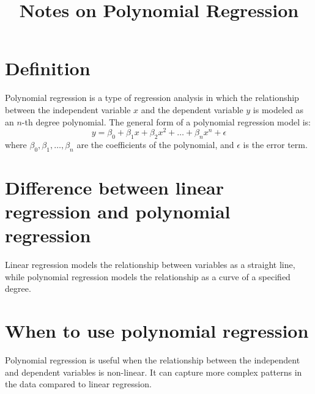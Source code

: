 \documentclass[conference]{IEEEtran}
\title{Notes on Polynomial Regression}
\author{
\IEEEauthorblockN{Luis Mendez}
}
\begin{document}
\maketitle

\section*{Definition}
Polynomial regression is a type of regression analysis in which the relationship between the independent variable \( x \) and the dependent variable \( y \) is modeled as an \( n \)-th degree polynomial. The general form of a polynomial regression model is:
\[y = \beta_0 + \beta_1 x + \beta_2 x^2 + \ldots + \beta_n x^n + \epsilon\]
where \( \beta_0, \beta_1, \ldots, \beta_n \) are the coefficients of the polynomial, and \( \epsilon \) is the error term.
\section*{Difference between linear regression and polynomial regression}
Linear regression models the relationship between variables as a straight line, while polynomial regression models the relationship as a curve of a specified degree.
\section*{When to use polynomial regression}
Polynomial regression is useful when the relationship between the independent and dependent variables is non-linear. It can
capture more complex patterns in the data compared to linear regression.
\end{document}
